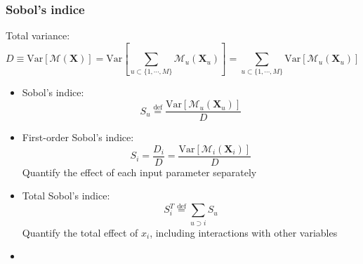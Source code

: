 \begin{frame}
\frametitle{Sobol's indice} 
\begin{block}{Total variance:}
\begin{equation*}
D\equiv \text{Var}[\mathcal{M}(\boldsymbol{X}) ]
= \text{Var}[\sum_{u \subset \{1,\cdots,M\}} \mathcal{M}_{u}(\boldsymbol{X}_{u}) ]
= \sum_{u \subset \{1,\cdots,M\}} \text{Var}[\mathcal{M}_{u}(\boldsymbol{X}_{u}) ] 
\end{equation*}    
\end{block}

\begin{itemize}
    \item Sobol's indice:
    \begin{equation*}
S_u   \overset{\mathrm{def}}{=} \frac{\text{Var}[\mathcal{M}_{u}(\boldsymbol{X}_{u}) ] }{D} 
    \end{equation*}

    \item First-order Sobol's indice:
     \begin{equation*}
S_i = \frac{D_i}{D} = \frac{\text{Var}[\mathcal{M}_{i}(\boldsymbol{X}_{i}) ] }{D}
    \end{equation*}
    Quantify the effect of each input parameter \alert{separately}

    \item Total Sobol's indice:
    \begin{equation*}
S_{i}^{T} \overset{\mathrm{def}}{=}  
\sum_{u \supset i} S_u
    \end{equation*}
    Quantify the \alert{total effect} of $x_{i}$, including \alert{interactions} with other variables

\item 
    
\end{itemize}
\end{frame}